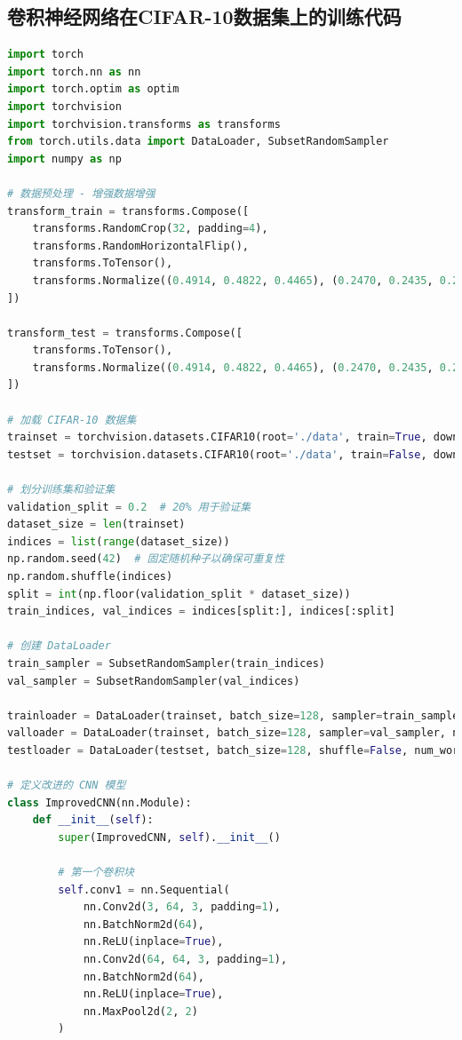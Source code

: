 \documentclass[UTF8]{report}
\theoremstyle{MyLineTheoremStyle} %
\theoremstyle{MyBlockTheoremStyle} %
\theoremstyle{MySubsubsectionStyle} %
\begin{document}
\subsection{卷积神经网络在CIFAR-10数据集上的训练代码}
\begin{lstlisting}[language=python, caption={神经网络CNN训练（纯手写）}, label={lst:cnn_train_handwritten}]
import torch
import torch.nn as nn
import torch.optim as optim
import torchvision
import torchvision.transforms as transforms
from torch.utils.data import DataLoader, SubsetRandomSampler
import numpy as np

# 数据预处理 - 增强数据增强
transform_train = transforms.Compose([
    transforms.RandomCrop(32, padding=4),
    transforms.RandomHorizontalFlip(),
    transforms.ToTensor(),
    transforms.Normalize((0.4914, 0.4822, 0.4465), (0.2470, 0.2435, 0.2616))
])

transform_test = transforms.Compose([
    transforms.ToTensor(),
    transforms.Normalize((0.4914, 0.4822, 0.4465), (0.2470, 0.2435, 0.2616))
])

# 加载 CIFAR-10 数据集
trainset = torchvision.datasets.CIFAR10(root='./data', train=True, download=True, transform=transform_train)
testset = torchvision.datasets.CIFAR10(root='./data', train=False, download=True, transform=transform_test)

# 划分训练集和验证集
validation_split = 0.2  # 20% 用于验证集
dataset_size = len(trainset)
indices = list(range(dataset_size))
np.random.seed(42)  # 固定随机种子以确保可重复性
np.random.shuffle(indices)
split = int(np.floor(validation_split * dataset_size))
train_indices, val_indices = indices[split:], indices[:split]

# 创建 DataLoader
train_sampler = SubsetRandomSampler(train_indices)
val_sampler = SubsetRandomSampler(val_indices)

trainloader = DataLoader(trainset, batch_size=128, sampler=train_sampler, num_workers=2)
valloader = DataLoader(trainset, batch_size=128, sampler=val_sampler, num_workers=2)
testloader = DataLoader(testset, batch_size=128, shuffle=False, num_workers=2)

# 定义改进的 CNN 模型
class ImprovedCNN(nn.Module):
    def __init__(self):
        super(ImprovedCNN, self).__init__()
        
        # 第一个卷积块
        self.conv1 = nn.Sequential(
            nn.Conv2d(3, 64, 3, padding=1),
            nn.BatchNorm2d(64),
            nn.ReLU(inplace=True),
            nn.Conv2d(64, 64, 3, padding=1),
            nn.BatchNorm2d(64),
            nn.ReLU(inplace=True),
            nn.MaxPool2d(2, 2)
        )
        

\end{lstlisting}
\end{document}
